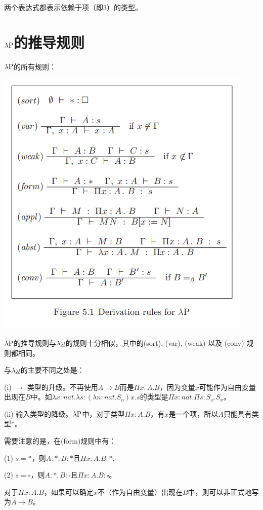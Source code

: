 \documentclass[UTF8]{article}
\begin{document}
		两个表达式都表示依赖于项（即3）的类型。
		
	\section{$\lambda{\rm P}$的推导规则}
		$\lambda{\rm P}$的所有规则：

		\includegraphics[width=0.93\linewidth]{"../imgs/5-1.png"}
		
		$\lambda{\rm P}$的推导规则与$\lambda{\uline{\omega}}$的规则十分相似，其中的(sort), (var), (weak) 以及 (conv) 规则都相同。
		
		与$\lambda{\uline{\omega}}$的主要不同之处是：
		
		(i) $\rightarrow$-类型的升级。不再使用$A\rightarrow B$而是$\Pi x:A.B$，因为变量$x$可能作为自由变量出现在$B$中。如$\lambda x:nat. \lambda s:(\lambda n:nat.S_n)x. s$的类型是$\Pi x:nat.\Pi s:S_x.S_x$。
		
		(ii) 输入类型的降级。$\lambda{\rm P}$中，对于类型$\Pi x:A.B$，有$x$是一个项，所以$A$只能具有类型$*$。
		
		需要注意的是，在(form)规则中有：
		
		(1) $s = *$，则$A:*,B:*$且$\Pi x:A.B:*$,
		
		(2) $s = \square$，则$A:*,B:\square$且$\Pi x:A.B:\square$。
		
		对于$\Pi x:A.B$，如果可以确定$x$不（作为自由变量）出现在$B$中，则可以非正式地写为$A\rightarrow B$。
		
\end{document}
